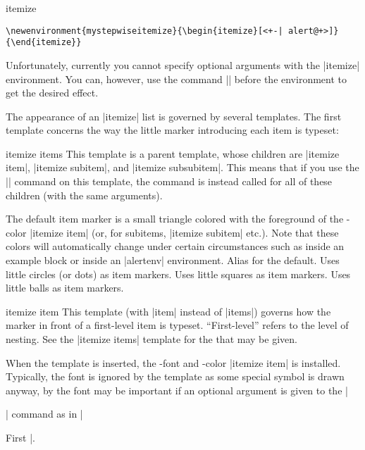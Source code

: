 \begin{environment}{{itemize}}
  \example
\begin{verbatim}
\newenvironment{mystepwiseitemize}{\begin{itemize}[<+-| alert@+>]}{\end{itemize}}
\end{verbatim}

  \lyxnote
  Unfortunately, currently you cannot specify optional arguments with
  the |itemize| environment. You can, however, use the command
  |\beamerdefaultoverlayspecification| before the environment to get
  the desired effect.

  The appearance of an |itemize| list is governed by several
  templates. The first template concerns the way the little marker
  introducing each item is typeset:  
  \begin{element}{itemize items}\semiyes\no\no
    This template is a parent template, whose children are
    |itemize item|, |itemize subitem|, and |itemize subsubitem|. This
    means that if you use the |\setbeamertemplate| command on this
    template, the command is instead called for all of these children
    (with the same arguments). 

    \begin{templateoptions}
      The default item marker is a small triangle colored with the 
      foreground of the \beamer-color |itemize item| (or, for
      subitems, |itemize subitem| etc.). Note that these colors will
      automatically change under certain circumstances such as inside
      an example block or inside an |alertenv| environment. 
      Alias for the default.
      Uses little circles (or dots) as item markers. 
      Uses little squares as item markers.
      Uses little balls as item markers.
    \end{templateoptions}
  \end{element}

  \begin{element}{itemize item}\yes\yes\yes
    This template (with |item| instead of |items|) governs how the
    marker in front of a first-level item is typeset. ``First-level''
    refers to the level of nesting. See the |itemize items| template
    for the  that may be given.

    When the template is inserted, the \beamer-font and -color
    |itemize item| is installed. Typically, the font is ignored by the
    template as some special symbol is drawn anyway, by the font may
    be important if an optional argument is given to the
    |\item| command as in |\item[First]|.


\end{element}
\end{environment}
